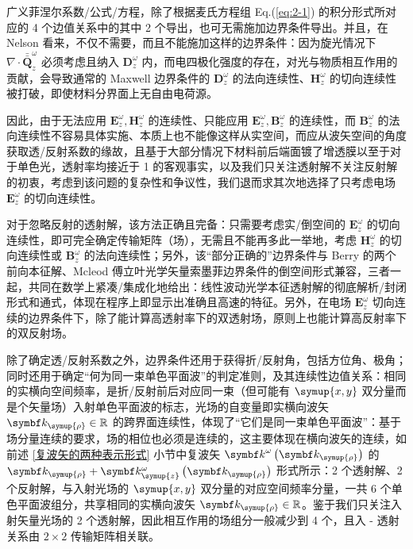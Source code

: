 广义菲涅尔系数/公式/方程，除了根据麦氏方程组 Eq.(\ref{eq:2-1}) 的积分形式所对应的 4 个边值关系中的其中 2 个导出，也可无需施加边界条件导出\cite{chenWavevectorspaceMethodWave1993,nelsonDerivingTransmissionReflection1995}。并且，在 Nelson 看来，不仅不需要，而且不能施加这样的边界条件\cite{nelsonDerivingTransmissionReflection1995}：因为旋光情况下 $\nabla \cdot \bar{\bar{\symbf Q}}^{\omega}_z$ 必须考虑且纳入 $\symbf D^{\omega}_z$ 内，而电四极化强度的存在，对光与物质相互作用的贡献，会导致通常的 Maxwell 边界条件的 $\symbf D^{\omega}_z$ 的法向连续性、$\symbf H^{\omega}_z$ 的切向连续性被打破，即使材料分界面上无自由电荷源\cite{nelsonDerivingTransmissionReflection1995}。

因此，由于无法应用 $\symbf E^{\omega}_z, \symbf H^{\omega}_z$ 的连续性、只能应用 $\symbf E^{\omega}_z, \symbf B^{\omega}_z$ 的连续性，而 $\symbf B^{\omega}_z$ 的法向连续性不容易具体实施、本质上也不能像这样从实空间，而应从波矢空间\cite{chenWavevectorspaceMethodWave1993}的角度获取透/反射系数的缘故，且基于大部分情况下材料前后端面镀了增透膜以至于对于单色光，透射率均接近于 1 的客观事实，以及我们只关注透射解不关注反射解的初衷，考虑到该问题的复杂性和争议性\cite{mcleodVectorFourierOptics2014}，我们退而求其次地选择了只考虑电场 $\symbf E^{\omega}_z$ 的切向连续性。

对于忽略反射的透射解，该方法正确且完备：只需要考虑实/倒空间的 $\symbf E^{\omega}_z$ 的切向连续性，即可完全确定传输矩阵（场），无需且不能再多此一举地，考虑 $\symbf H^{\omega}_z$ 的切向连续性或 $\symbf B^{\omega}_z$ 的法向连续性；另外，该“部分正确的”边界条件与 Berry 的两个前向本征解\cite{berryOpticalSingularitiesBirefringent2003}、Mcleod 傅立叶光学矢量索墨菲边界条件的倒空间形式\cite{mcleodVectorFourierOptics2014}兼容，三者一起，共同在数学上紧凑/集成化地给出：线性波动光学本征透射解的彻底解析/封闭形式和通式，体现在程序上即显示出准确且高速的特征。另外，在电场 $\symbf E^{\omega}_z$ 切向连续的边界条件下，除了能计算高透射率下的双透射场，原则上也能计算高反射率下的双反射场。

除了确定透/反射系数之外，边界条件还用于获得折/反射角，包括方位角、极角；同时还用于确定“何为同一束单色平面波”的判定准则，及其连续性边值关系：相同的实横向空间频率，是折/反射前后对应同一束（但可能有 $\symup{x,y}$ 双分量而是个矢量场）入射单色平面波的标志，光场的自变量即实横向波矢 $\symbf k_{\symup{\rho}} \in \mathbb{R}$ 的跨界面连续性，体现了“它们是同一束单色平面波”：基于场分量连续的要求，场的相位也必须是连续的，这主要体现在横向波矢的连续，如前述 \ref{复波矢的两种表示形式} 小节中复波矢 ${\symbf k}^\omega \left( \symbf k_{\symup{\rho}} \right)$ 的 $\symbf k_{\symup{\rho}} + \symbf k^\omega_{\symup{z}} \left( \symbf k_{\symup{\rho}} \right)$ 形式所示：2 个透射解、2 个反射解，与入射光场的 $\symup{x,y}$ 双分量的对应空间频率分量，一共 6 个单色平面波组分，共享相同的实横向波矢 $\symbf k_{\symup{\rho}} \in \mathbb{R}$。鉴于我们只关注入射矢量光场的 2 个透射解，因此相互作用的场组分一般减少到 4 个，且入 - 透射关系由 $2 \times 2$ 传输矩阵相关联。

